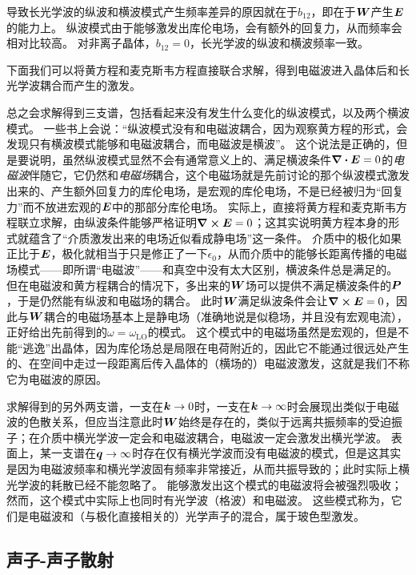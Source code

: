导致长光学波的纵波和横波模式产生频率差异的原因就在于$b_{12}$，即在于$\vb*{W}$产生$\vb*{E}$的能力上。
纵波模式由于能够激发出库伦电场，会有额外的回复力，从而频率会相对比较高。
对非离子晶体，$b_{12}=0$，长光学波的纵波和横波频率一致。

下面我们可以将黄方程和麦克斯韦方程直接联合求解，得到电磁波进入晶体后和长光学波耦合而产生的激发。

总之会求解得到三支谱，包括看起来没有发生什么变化的纵波模式，以及两个横波模式。
一些书上会说：“纵波模式没有和电磁波耦合，因为观察黄方程的形式，会发现只有横波模式能够和电磁波耦合，而电磁波是横波”。
这个说法是正确的，但是要说明，虽然纵波模式显然不会有通常意义上的、满足横波条件$\div{\vb*{E}}=0$的\emph{电磁波}伴随它，它仍然和\emph{电磁场}耦合，这个电磁场就是先前讨论的那个纵波模式激发出来的、产生额外回复力的库伦电场，是宏观的库伦电场，不是已经被归为“回复力”而不放进宏观的$\vb*{E}$中的那部分库伦电场。
实际上，直接将黄方程和麦克斯韦方程联立求解，由纵波条件能够严格证明$\curl{\vb*{E}}=0$；这其实说明黄方程本身的形式就蕴含了“介质激发出来的电场近似看成静电场”这一条件。
介质中的极化如果正比于$\vb*{E}$，极化就相当于只是修正了一下$\epsilon_0$，从而介质中的能够长距离传播的电磁场模式——即所谓“电磁波”——和真空中没有太大区别，横波条件总是满足的。
但在电磁波和黄方程耦合的情况下，多出来的$\vb*{W}$场可以提供不满足横波条件的$\vb*{P}$，于是仍然能有纵波和电磁场的耦合。
此时$\vb*{W}$满足纵波条件会让$\curl{\vb*{E}}=0$，因此与$\vb*{W}$耦合的电磁场基本上是静电场（准确地说是似稳场，并且没有宏观电流），正好给出先前得到的$\omega=\omega_\text{LO}$的模式。
这个模式中的电磁场虽然是宏观的，但是不能“逃逸”出晶体，因为库伦场总是局限在电荷附近的，因此它不能通过很远处产生的、在空间中走过一段距离后传入晶体的（横场的）电磁波激发，这就是我们不称它为电磁波的原因。

求解得到的另外两支谱，一支在$\vb*{k} \to 0$时，一支在$\vb*{k} \to \infty$时会展现出类似于电磁波的色散关系，但应当注意此时$\vb*{W}$始终是存在的，类似于远离共振频率的受迫振子；在介质中横光学波一定会和电磁波耦合，电磁波一定会激发出横光学波。
表面上，某一支谱在$\vb*{q} \to \infty$时存在仅有横光学波而没有电磁波的模式，但是这其实是因为电磁波频率和横光学波固有频率非常接近，从而共振导致的；此时实际上横光学波的耗散已经不能忽略了。
能够激发出这个模式的电磁波将会被强烈吸收；然而，这个模式中实际上也同时有光学波（格波）和电磁波。
这些模式称为，它们是电磁波和（与极化直接相关的）光学声子的混合，属于玻色型激发。

\subsection{声子-声子散射}

